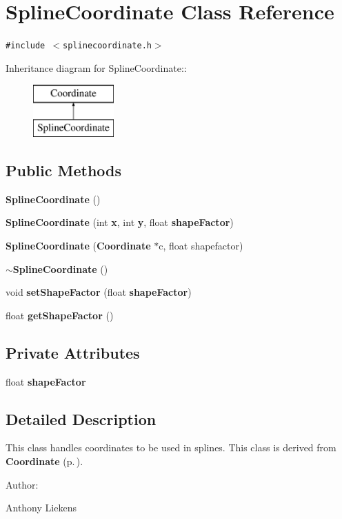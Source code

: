 \section{Spline\-Coordinate Class Reference}
\label{classSplineCoordinate}
{\tt \#include $<$splinecoordinate.h$>$}

Inheritance diagram for Spline\-Coordinate::\begin{figure}[H]
\begin{center}
\leavevmode
\includegraphics[height=2cm]{classSplineCoordinate}
\end{center}
\end{figure}
\subsection*{Public Methods}
\begin{CompactItemize}
\item 
{\bf Spline\-Coordinate} ()
\item 
{\bf Spline\-Coordinate} (int {\bf x}, int {\bf y}, float {\bf shape\-Factor})
\item 
{\bf Spline\-Coordinate} ({\bf Coordinate} $\ast$c, float shapefactor)
\item 
{\bf $\sim$Spline\-Coordinate} ()
\item 
void {\bf set\-Shape\-Factor} (float {\bf shape\-Factor})
\item 
float {\bf get\-Shape\-Factor} ()
\end{CompactItemize}
\subsection*{Private Attributes}
\begin{CompactItemize}
\item 
float {\bf shape\-Factor}
\end{CompactItemize}


\subsection{Detailed Description}
This class handles coordinates to be used in splines. This class is derived from {\bf Coordinate} {\rm (p.\,\pageref{classCoordinate})}. \begin{Desc}
\item[Author: ]\par
Anthony Liekens \end{Desc}




